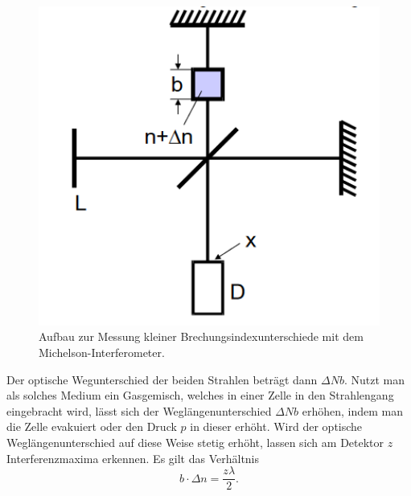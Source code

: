 \begin{figure}[h]
    \centering
    \includegraphics[width=12cm]{content/brechungsindex.png}
    \caption{Aufbau zur Messung kleiner Brechungsindexunterschiede mit dem Michelson-Interferometer. \cite{sample}}
    \label{fig:index}
  \end{figure}

Der optische Wegunterschied der beiden Strahlen beträgt dann $\Delta N b$. 
Nutzt man als solches Medium ein Gasgemisch, welches in einer Zelle in den Strahlengang eingebracht
wird, lässt sich der Weglängenunterschied $\Delta N b$ erhöhen, indem man die Zelle evakuiert oder den Druck $p$ in dieser erhöht.
Wird der optische Weglängenunterschied auf diese Weise stetig erhöht, lassen sich am Detektor $z$ Interferenzmaxima erkennen.
Es gilt das Verhältnis
\begin{equation}
    b \cdot  \Delta n = \frac{z\lambda}{2} .
    \label{eqn:deltan}
\end{equation} 


